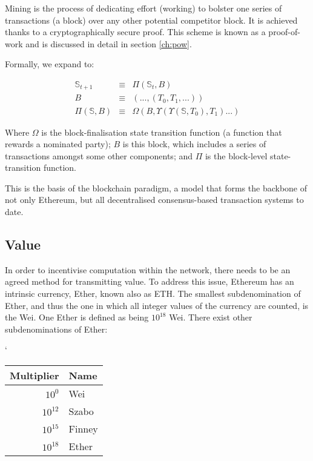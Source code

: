 \documentclass[9pt,oneside]{amsart}
\begin{document}
\begin{multicols}{2}
Mining is the process of dedicating effort (working) to bolster one series of transactions (a block) over any other potential competitor block. It is achieved thanks to a cryptographically secure proof. This scheme is known as a proof-of-work and is discussed in detail in section \ref{ch:pow}.

Formally, we expand to:

\begin{eqnarray}
\mathbb{S}_{t+1} & \equiv & \Pi(\mathbb{S}_t, B) \\
B & \equiv & (..., (T_0, T_1, ...) ) \\
\Pi(\mathbb{S}, B) & \equiv & \Omega(B, \Upsilon(\Upsilon(\mathbb{S}, T_0), T_1) ...)
\end{eqnarray}

Where $\Omega$ is the block-finalisation state transition function (a function that rewards a nominated party); $B$ is this block, which includes a series of transactions amongst some other components; and $\Pi$ is the block-level state-transition function.

This is the basis of the blockchain paradigm, a model that forms the backbone of not only Ethereum, but all decentralised consensus-based transaction systems to date.

\subsection{Value}

In order to incentivise computation within the network, there needs to be an agreed method for transmitting value. To address this issue, Ethereum has an intrinsic currency, Ether, known also as {\small ETH}. The smallest subdenomination of Ether, and thus the one in which all integer values of the currency are counted, is the Wei. One Ether is defined as being $10^{18}$ Wei. There exist other subdenominations of Ether:
\par`
\begin{center}
\begin{tabular}{rl}
\toprule
Multiplier & Name \\
\midrule
$10^0$ & Wei \\
$10^{12}$ & Szabo \\
$10^{15}$ & Finney \\
$10^{18}$ & Ether \\
\bottomrule
\end{tabular}
\end{center}
\par


\end{multicols}
\end{document}
